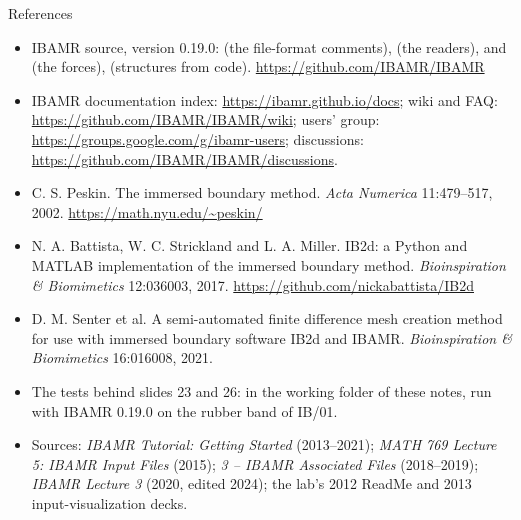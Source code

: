 \documentclass[aspectratio=169,11pt]{beamer}
\begin{document}
\begin{frame}{References}
\scriptsize
\begin{itemize}
  \item IBAMR source, version 0.19.0:  (the file-format comments),  (the readers),  and  (the forces),  (structures from code). \url{https://github.com/IBAMR/IBAMR}
  \item IBAMR documentation index: \url{https://ibamr.github.io/docs}; wiki and FAQ: \url{https://github.com/IBAMR/IBAMR/wiki}; users' group: \url{https://groups.google.com/g/ibamr-users}; discussions: \url{https://github.com/IBAMR/IBAMR/discussions}.
  \item C. S. Peskin. The immersed boundary method. \emph{Acta Numerica} 11:479--517, 2002. \url{https://math.nyu.edu/~peskin/}
  \item N. A. Battista, W. C. Strickland and L. A. Miller. IB2d: a Python and MATLAB implementation of the immersed boundary method. \emph{Bioinspiration \& Biomimetics} 12:036003, 2017. \url{https://github.com/nickabattista/IB2d}
  \item D. M. Senter et al. A semi-automated finite difference mesh creation method for use with immersed boundary software IB2d and IBAMR. \emph{Bioinspiration \& Biomimetics} 16:016008, 2021.
  \item The tests behind slides 23 and 26:  in the working folder of these notes, run with IBAMR 0.19.0 on the rubber band of IB/01.
  \item Sources: \emph{IBAMR Tutorial: Getting Started} (2013--2021); \emph{MATH 769 Lecture 5: IBAMR Input Files} (2015); \emph{3 -- IBAMR Associated Files} (2018--2019); \emph{IBAMR Lecture 3} (2020, edited 2024); the lab's 2012 ReadMe and 2013 input-visualization decks.
\end{itemize}
\end{frame}
\end{document}
